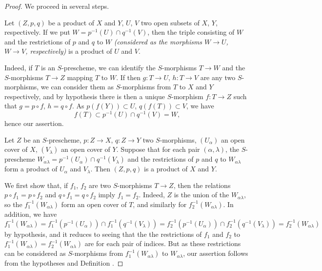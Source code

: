\begin{proof}
\label{proof-1.3.2.6}
We proceed in several steps.

\begin{lem}[3.2.6.1]
\label{1.3.2.6.1}
Let $(Z,p,q)$ be a product of $X$ and $Y$, $U$, $V$ two open subsets of $X$, $Y$,
respectively. If we put $W=p^{-1}(U)\cap q^{-1}(V)$, then the triple consisting of $W$ and
the restrictions of $p$ and $q$ to $W$ \emph{(considered as the morphisms $W\to U$, $W\to V$,
respectively)} is a product of $U$ and $V$.
\end{lem}

Indeed, if $T$ is an $S$-prescheme, we can identify the $S$-morphisms $T\to W$ and the
$S$-morphisms $T\to Z$ mapping $T$ to $W$. If then $g:T\to U$, $h:T\to V$ are any two
$S$-morphisms, we can consider them as $S$-morphisms from $T$ to $X$ and $Y$ respectively,
and by hypothesis there is then a unique $S$-morphism $f:T\to Z$ such that $g=p\circ f$,
$h=q\circ f$. As $p(f(Y))\subset U$, $q(f(T))\subset V$, we have
\[
  f(T)\subset p^{-1}(U)\cap q^{-1}(V)=W,
\]
hence our assertion.

\begin{lem}[3.2.6.2]
\label{1.3.2.6.2}
Let $Z$ be an $S$-prescheme, $p:Z\to X$, $q:Z\to Y$ two $S$-morphisms, $(U_\alpha)$ an open
cover of $X$, $(V_\lambda)$ an open cover of $Y$. Suppose that for each pair
$(\alpha,\lambda)$, the $S$-prescheme
$W_{\alpha\lambda}=p^{-1}(U_\alpha)\cap q^{-1}(V_\lambda)$ and the restrictions of $p$ and
$q$ to $W_{\alpha\lambda}$ form a product of $U_\alpha$ and $V_\lambda$. Then $(Z,p,q)$ is a
product of $X$ and $Y$.
\end{lem}

We first show that, if $f_1$, $f_2$ are two $S$-morphisms $T\to Z$, then the relations
$p\circ f_1=p\circ f_2$ and $q\circ f_1=q\circ f_2$ imply $f_1=f_2$. Indeed, $Z$ is the union
of the $W_{\alpha\lambda}$, so the $f_1^{-1}(W_{\alpha\lambda})$ form an open cover of $T$,
and similarly for $f_2^{-1}(W_{\alpha\lambda})$. In addition, we have
\[
  f_1^{-1}(W_{\alpha\lambda})=f_1^{-1}(p^{-1}(U_\alpha))\cap f_1^{-1}(q^{-1}(V_\lambda))
  =f_2^{-1}(p^{-1}(U_\alpha))\cap f_2^{-1}(q^{-1}(V_\lambda))=f_2^{-1}(W_{\alpha\lambda})
\]
by hypothesis, and it reduces to seeing that the the restrictions of $f_1$ and $f_2$ to
$f_1^{-1}(W_{\alpha\lambda})=f_2^{-1}(W_{\alpha\lambda})$ are  for each pair of
indices. But as these restrictions can be considered as $S$-morphisms from
$f_1^{-1}(W_{\alpha\lambda})$ to $W_{\alpha\lambda}$, our assertion follows from the
hypotheses and Definition .


\end{proof}
